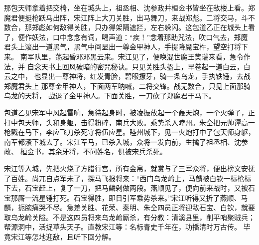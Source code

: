 那包天师拿着把交椅，坐在城头上，祖丞相、沈参政并桓佥书皆坐在敌楼上看。郑
魔君便挺枪跃马出阵，宋江阵上大刀关胜，出马舞刀，来战郑彪。二将交马，斗不
数合，那郑彪如何敌得关胜，只办得架隔遮拦，左右躲闪。这包道乙正在城头上看
了，便作妖法，口中念念有词，喝声道：“疾！”念着那助咒法，吹口气去，郑魔
君头上滚出一道黑气，黑气中间显出一尊金甲神人，手提降魔宝杵，望空打将下来。
南军队里，荡起昏邓邓黑云来。宋江见了，便唤混世魔王樊瑞来看，急令作法，并
自念天书上回风破暗的密咒秘诀。只见关胜头盔上，早卷起一道白云，白云之中，
也显出一尊神将，红发青脸，碧眼撩牙，骑一条乌龙，手执铁锤，去战郑魔君头上
那尊金甲神人，下面两军呐喊，二将交锋。战无数合，只见上面那骑乌龙的天将，
战退了金甲神人。下面关胜，一刀砍了郑魔君于马下。

包道乙见宋军中风起雷响，急待起身时，被凌振放起一个轰天炮，一个火弹子，正
打中包天师，头和身躯，击得粉碎，南兵大败。乘势杀入睦州。朱仝把元帅谭高一
枪戳在马下，李应飞刀杀死守将伍应星。睦州城下，见一火炮打中了包天师身躯，
南军都滚下城去了。宋江军马，已杀入城，众将一发向前，生擒了祖丞相、沈参政、
桓佥书，其余牙将，不问姓名，俱被宋兵杀死。

宋江等入城，先把火烧了方腊行宫，所有金帛，就赏与了三军众将，便出榜文安抚
了百姓。尚兀自点军未了，探马飞报将来：“西门乌龙岭上，马麟被白钦一标枪标
下去，石宝赶上，复了一刀，把马麟剁做两段。燕顺见了，便向前来战时，又被石
宝那厮一流星锤打死。石宝得胜，即日引军乘势杀来。”宋江听得又折了燕顺、马
麟，扼腕痛哭不尽。急差关胜、花荣、秦明、朱仝四员正将迎敌石宝、白钦，就要
取乌龙岭关隘。不是这四员将来乌龙岭厮杀，有分教：清溪县里，削平哨聚贼兵；
帮源洞中，活捉草头天子。直教宋江等：名标青史千年在，功播清时万古传。
毕竟宋江等怎地迎敌，且听下回分解。